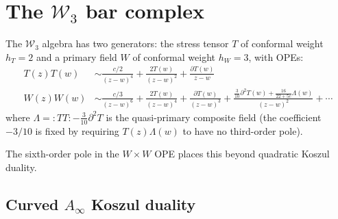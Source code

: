 \section{The $\mathcal{W}_3$ bar complex}

\begin{example}\label{ex:w3-ope-structure}
The $\mathcal{W}_3$ algebra has two generators: the stress tensor $T$ of conformal weight $h_T = 2$ and a primary field $W$ of conformal weight $h_W = 3$, with OPEs:
\begin{align}
T(z)T(w) &\sim \frac{c/2}{(z-w)^4} + \frac{2T(w)}{(z-w)^2} + \frac{\partial T(w)}{z-w} \\
W(z)W(w) &\sim \frac{c/3}{(z-w)^6} + \frac{2T(w)}{(z-w)^4} + \frac{\partial T(w)}{(z-w)^3} + \frac{\frac{3}{10}\partial^2 T(w) + \frac{16}{22+5c}\Lambda(w)}{(z-w)^2} + \cdots
\end{align}
where $\Lambda = {:}TT{:} - \frac{3}{10}\partial^2 T$ is the quasi-primary composite field (the coefficient $-3/10$ is fixed by requiring $T(z)\Lambda(w)$ to have no third-order pole).

The sixth-order pole in the $W \times W$ OPE places this beyond quadratic Koszul duality.
\end{example}

\subsection{\texorpdfstring{Curved $A_\infty$ Koszul duality}{Curved A-infinity Koszul duality}}

